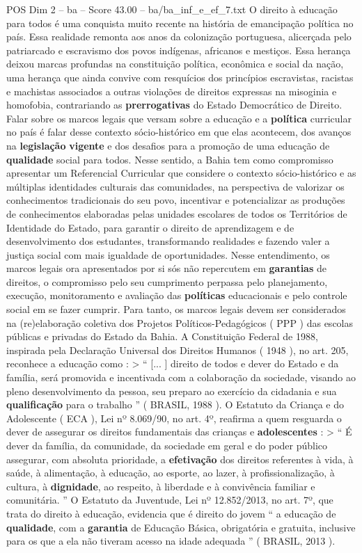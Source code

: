 \begin{textsample}{POS Dim 2 – ba – Score 43.00 – ba/ba\_inf\_e\_ef\_7.txt}  \label{ex:f2_pos_032}
O direito à educação para todos é uma conquista muito recente na história de emancipação política no país.
Essa realidade remonta aos anos da colonização portuguesa, alicerçada pelo patriarcado e escravismo dos povos indígenas, africanos e mestiços.
Essa herança deixou marcas profundas na constituição política, econômica e social da nação, uma herança que ainda convive com resquícios dos princípios escravistas, racistas e machistas associados a outras violações de direitos expressas na misoginia e homofobia, contrariando as \textbf{prerrogativas} do Estado Democrático de Direito.
Falar sobre os marcos legais que versam sobre a educação e a \textbf{política} curricular no país é falar desse contexto sócio-histórico em que elas acontecem, dos avanços na \textbf{legislação} \textbf{vigente} e dos desafios para a promoção de uma educação de \textbf{qualidade} social para todos.
Nesse sentido, a Bahia tem como compromisso apresentar um Referencial Curricular que considere o contexto sócio-histórico e as múltiplas identidades culturais das comunidades, na perspectiva de valorizar os conhecimentos tradicionais do seu povo, incentivar e potencializar as produções de conhecimentos elaboradas pelas unidades escolares de todos os Territórios de Identidade do Estado, para garantir o direito de aprendizagem e de desenvolvimento dos estudantes, transformando realidades e fazendo valer a justiça social com mais igualdade de oportunidades.
Nesse entendimento, os marcos legais ora apresentados por si sós não repercutem em \textbf{garantias} de direitos, o compromisso pelo seu cumprimento perpassa pelo planejamento, execução, monitoramento e avaliação das \textbf{políticas} educacionais e pelo controle social em se fazer cumprir.
Para tanto, os marcos legais devem ser considerados na (re)elaboração coletiva dos Projetos Políticos-Pedagógicos ( PPP ) das escolas públicas e privadas do Estado da Bahia.
A Constituição Federal de 1988, inspirada pela Declaração Universal dos Direitos Humanos ( 1948 ), no art. 205, reconhece a educação como : > “ [... ] direito de todos e dever do Estado e da família, será promovida e incentivada com a colaboração da sociedade, visando ao pleno desenvolvimento da pessoa, seu preparo ao exercício da cidadania e sua \textbf{qualificação} para o trabalho ” ( BRASIL, 1988 ).
O Estatuto da Criança e do Adolescente ( ECA ), Lei nº 8.069/90, no art. 4º, reafirma a quem resguarda o dever de assegurar os direitos fundamentais das crianças e \textbf{adolescentes} : > “ É dever da família, da comunidade, da sociedade em geral e do poder público assegurar, com absoluta prioridade, a \textbf{efetivação} dos direitos referentes à vida, à saúde, à alimentação, à educação, ao esporte, ao lazer, à profissionalização, à cultura, à \textbf{dignidade}, ao respeito, à liberdade e à convivência familiar e comunitária. ” O Estatuto da Juventude, Lei nº 12.852/2013, no art. 7º, que trata do direito à educação, evidencia que é direito do jovem “ a educação de \textbf{qualidade}, com a \textbf{garantia} de Educação Básica, obrigatória e gratuita, inclusive para os que a ela não tiveram acesso na idade adequada ” ( BRASIL, 2013 ).

\end{textsample}
